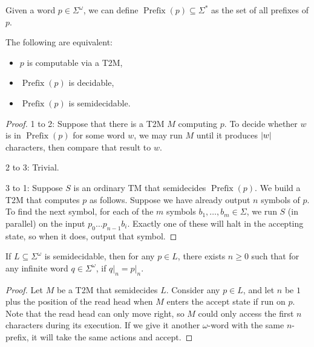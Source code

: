 Given a word $p \in \Sigma^\omega$, we can define $\operatorname{Prefix}(p)
\subseteq \Sigma^*$ as the set of all prefixes of $p$.

\begin{theorem}
  The following are equivalent:
  \begin{itemize}
  \item $p$ is computable via a T2M,
  \item $\operatorname{Prefix}(p)$ is decidable,
  \item $\operatorname{Prefix}(p)$ is semidecidable.
  \end{itemize}
\end{theorem}

\begin{proof}
  1 to 2:
  Suppose that there is a T2M $M$ computing $p$.
  To decide whether $w$ is in $\operatorname{Prefix}(p)$ for some word $w$, we
  may run $M$ until it produces $\left| w \right|$ characters, then compare that result
  to $w$.

  2 to 3:
  Trivial.

  3 to 1:
  Suppose $S$ is an ordinary TM that semidecides $\operatorname{Prefix}(p)$.
  We build a T2M that computes $p$ as follows.
  Suppose we have already output $n$ symbols of $p$.
  To find the next symbol, for each of the $m$ symbols $b_1, \ldots, b_m \in
  \Sigma$, we run $S$ (in parallel) on the input $p_0 \ldots p_{n-1} b_i$.
  Exactly one of these will halt in the accepting state, so when it does, output
  that symbol.
\end{proof}


\begin{theorem}%
  \label{thm:tizr:topology-1}
  If $L \subseteq \Sigma^\omega$ is semidecidable, then for any $p \in L$, there
  exists $n \ge 0$ such that for any infinite word $q \in \Sigma^\omega$, if
  $\left. q \right|_n = \left. p \right|_n$.
\end{theorem}

\begin{proof}
  Let $M$ be a T2M that semidecides $L$.
  Consider any $p \in L$, and let $n$ be $1$ plus the position of the read head
  when $M$ enters the accept state if run on $p$.
  Note that the read head can only move right, so $M$ could only access the
  first $n$ characters during its execution.
  If we give it another $\omega$-word with the same $n$-prefix, it will take the
  same actions and accept.
\end{proof}


